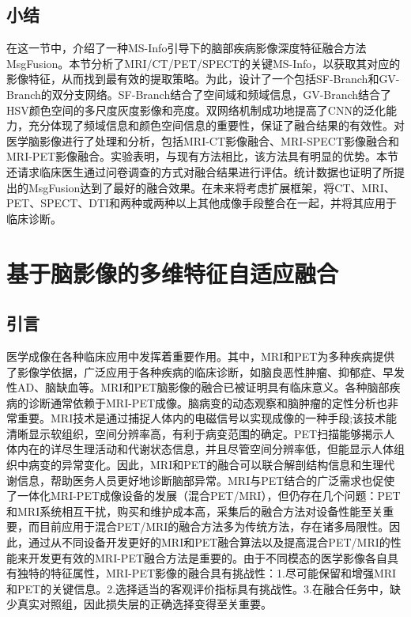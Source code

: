 \subsection{小结}
在这一节中，介绍了一种MS-Info引导下的脑部疾病影像深度特征融合方法MsgFusion。本节分析了MRI/CT/PET/SPECT的关键MS-Info，以获取其对应的影像特征，从而找到最有效的提取策略。为此，设计了一个包括SF-Branch和GV-Branch的双分支网络。SF-Branch结合了空间域和频域信息，GV-Branch结合了HSV颜色空间的多尺度灰度影像和亮度。双网络机制成功地提高了CNN的泛化能力，充分体现了频域信息和颜色空间信息的重要性，保证了融合结果的有效性。对医学脑影像进行了处理和分析，包括MRI-CT影像融合、MRI-SPECT影像融合和MRI-PET影像融合。实验表明，与现有方法相比，该方法具有明显的优势。本节还请求临床医生通过问卷调查的方式对融合结果进行评估。统计数据也证明了所提出的MsgFusion达到了最好的融合效果。在未来将考虑扩展框架，将CT、MRI、PET、SPECT、DTI和两种或两种以上其他成像手段整合在一起，并将其应用于临床诊断。

\section{基于脑影像的多维特征自适应融合} \label{chapter3.2:MdAFuse}

\subsection{引言}
医学成像在各种临床应用中发挥着重要作用。其中，MRI和PET为多种疾病提供了影像学依据，广泛应用于各种疾病的临床诊断，如脑良恶性肿瘤、抑郁症、早发性AD、脑缺血等。MRI和PET脑影像的融合已被证明具有临床意义\cite{nakamoto2009clinical,heiss2009potential}。各种脑部疾病的诊断通常依赖于MRI-PET成像。脑病变的动态观察和脑肿瘤的定性分析也非常重要\cite{2019Inter}。MRI技术是通过捕捉人体内的电磁信号以实现成像的一种手段;该技术能清晰显示软组织，空间分辨率高，有利于病变范围的确定。PET扫描能够揭示人体内在的详尽生理活动和代谢状态信息，并且尽管空间分辨率低，但能显示人体组织中病变的异常变化。因此，MRI和PET的融合可以联合解剖结构信息和生理代谢信息，帮助医务人员更好地诊断脑部异常。MRI与PET结合的广泛需求也促使了一体化MRI-PET成像设备的发展（混合PET/MRI），但仍存在几个问题：PET和MRI系统相互干扰，购买和维护成本高，采集后的融合方法对设备性能至关重要，而目前应用于混合PET/MRI的融合方法多为传统方法，存在诸多局限性。因此，通过从不同设备开发更好的MRI和PET融合算法以及提高混合PET/MRI的性能来开发更有效的MRI-PET融合方法是重要的。由于不同模态的医学影像各自具有独特的特征属性，MRI-PET影像的融合具有挑战性：1.尽可能保留和增强MRI和PET的关键信息。2.选择适当的客观评价指标具有挑战性。3.在融合任务中，缺少真实对照组，因此损失层的正确选择变得至关重要。

